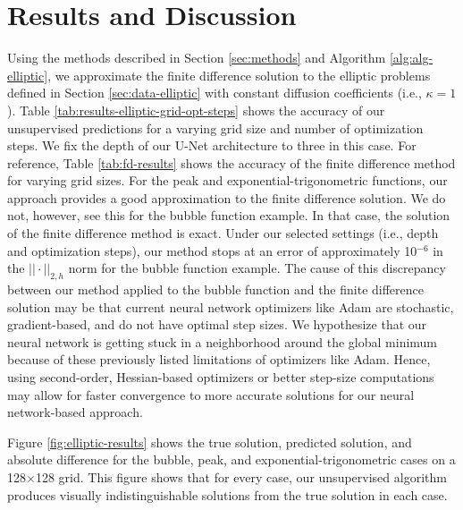 \documentclass[preprint,12pt]{elsarticle}
\begin{document}
\section{Results and Discussion}\label{sec:results}
Using the methods described in Section \ref{sec:methods} and Algorithm \ref{alg:alg-elliptic}, we approximate the finite difference solution to the elliptic problems defined in Section \ref{sec:data-elliptic} with constant diffusion coefficients (i.e., $\kappa=1$). Table \ref{tab:results-elliptic-grid-opt-steps} shows the accuracy of our unsupervised predictions for a varying grid size and number of optimization steps. We fix the depth of our U-Net architecture to three in this case. For reference, Table \ref{tab:fd-results} shows the accuracy of the finite difference method for varying grid sizes. For the peak and exponential-trigonometric functions, our approach provides a good approximation to the finite difference solution. We do not, however, see this for the bubble function example. In that case, the solution of the finite difference method is exact. Under our selected settings (i.e., depth and optimization steps), our method stops at an error of approximately 10$^{-6}$ in the $|| \cdot ||_{2, h}$ norm for the bubble function example. The cause of this discrepancy between our method applied to the bubble function and the finite difference solution may be that current neural network optimizers like Adam are stochastic, gradient-based, and do not have optimal step sizes. We hypothesize that our neural network is getting stuck in a neighborhood around the global minimum because of these previously listed limitations of optimizers like Adam. Hence, using second-order, Hessian-based optimizers or better step-size computations may allow for faster convergence to more accurate solutions for our neural network-based approach.

Figure \ref{fig:elliptic-results} shows the true solution, predicted solution, and absolute difference for the bubble, peak, and exponential-trigonometric cases on a 128$\times$128 grid. This figure shows that for every case, our unsupervised algorithm produces visually indistinguishable solutions from the true solution in each case. 
\end{document}

